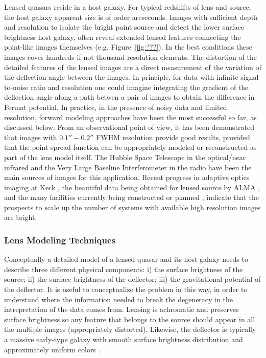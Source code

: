 Lensed quasars reside in a host galaxy. For typical redshifts of lens
and source, the host galaxy apparent size is of order
arcseconds. Images with sufficient depth and resolution to isolate the
bright point source and detect the lower surface brightness host
galaxy, often reveal extended lensed features connecting the
point-like images themselves (e.g. Figure~\ref{fig:???}). In the best conditions
these images cover hundreds if not thousand resolution elements. The
distortion of the detailed features of the lensed images are a direct
measurement of the variation of the deflection angle between the
images.  In principle, for data with infinite signal-to-noise ratio
and resolution one could imagine integrating the gradient of the
deflection angle along a path betwen a pair of images to obtain the
difference in Fermat potential. In practice, in the presence of noisy
data and limited resolution, forward modeling approaches have been the
most successful so far, as discussed below. From an observational
point of view, it has been demonstrated that images with $0.1''-0.2''$
FWHM resolution provide good results, provided that the point spread
function can be appropriately modeled or reconstructed as part of the
lens model itself. The Hubble Space Telescope in the optical/near
infrared \citep{Suy++10,Suy++13,Suy++14,Birrer} and the Very Large
Baseline Interferometer in the radio \citep{WBB04} have been the main
sources of images for this application. Recent progress in adaptive
optics imaging at Keck \citep{Che++16}, the beautiful data being
obtained for lensed source by ALMA \citep{Hezaveh++13}, and the many
facilities currently being constructed or planned \citep{Men++15},
indicate that the prospects to scale up the number of systems with
available high resolution images are bright.


\subsubsection{Lens Modeling Techniques}

Conceptually a detailed model of a lensed quasar and its host galaxy
needs to describe three different physical components: i) the surface
brightness of the source; ii) the surface brightness of the deflector;
iii) the gravitational potential of the deflector. It is useful to
conceptualize the problem in this way, in order to understand where
the information needed to break the degeneracy in the intrepretation
of the data comes from. Lensing is achromatic and preserves surface
brightness so any feature that belongs to the source \cite[including
in line of sight velocity][]{} should appear in all the multiple
images (appropriately distorted). Likewise, the deflector is typically
a massive early-type galaxy with smooth surface brightness
distribution and approximately uniform colors \cite[except for dust,
see, e.g.][]{Suy++10}.

